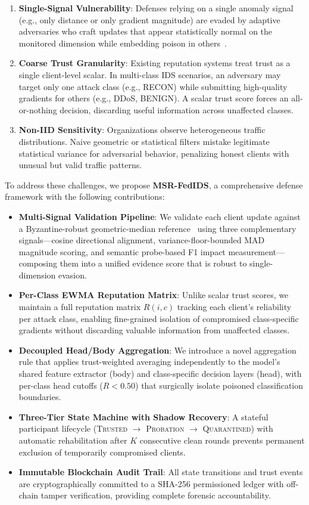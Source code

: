 \documentclass[conference]{IEEEtran}
\begin{document}
\begin{enumerate}
    \item \textbf{Single-Signal Vulnerability}: Defenses relying on a single anomaly signal (e.g., only distance or only gradient magnitude) are evaded by adaptive adversaries who craft updates that appear statistically normal on the monitored dimension while embedding poison in others~\cite{fang2020local}.
    \item \textbf{Coarse Trust Granularity}: Existing reputation systems treat trust as a single client-level scalar. In multi-class IDS scenarios, an adversary may target only one attack class (e.g., RECON) while submitting high-quality gradients for others (e.g., DDoS, BENIGN). A scalar trust score forces an all-or-nothing decision, discarding useful information across unaffected classes.
    \item \textbf{Non-IID Sensitivity}: Organizations observe heterogeneous traffic distributions. Naive geometric or statistical filters mistake legitimate statistical variance for adversarial behavior, penalizing honest clients with unusual but valid traffic patterns.
\end{enumerate}

To address these challenges, we propose \textbf{MSR-FedIDS}, a comprehensive defense framework with the following contributions:

\begin{itemize}
    \item \textbf{Multi-Signal Validation Pipeline}: We validate each client update against a Byzantine-robust geometric-median reference~\cite{chen2017distributed} using three complementary signals---cosine directional alignment, variance-floor-bounded MAD magnitude scoring, and semantic probe-based F1 impact measurement---composing them into a unified evidence score that is robust to single-dimension evasion.
    \item \textbf{Per-Class EWMA Reputation Matrix}: Unlike scalar trust scores, we maintain a full reputation matrix $R(i, c)$ tracking each client's reliability per attack class, enabling fine-grained isolation of compromised class-specific gradients without discarding valuable information from unaffected classes.
    \item \textbf{Decoupled Head/Body Aggregation}: We introduce a novel aggregation rule that applies trust-weighted averaging independently to the model's shared feature extractor (body) and class-specific decision layers (head), with per-class head cutoffs ($R < 0.50$) that surgically isolate poisoned classification boundaries.
    \item \textbf{Three-Tier State Machine with Shadow Recovery}: A stateful participant lifecycle (\textsc{Trusted} $\to$ \textsc{Probation} $\to$ \textsc{Quarantined}) with automatic rehabilitation after $K$ consecutive clean rounds prevents permanent exclusion of temporarily compromised clients.
    \item \textbf{Immutable Blockchain Audit Trail}: All state transitions and trust events are cryptographically committed to a SHA-256 permissioned ledger with off-chain tamper verification, providing complete forensic accountability.
\end{itemize}
\end{document}

